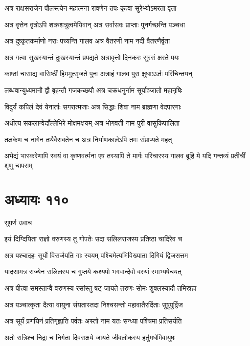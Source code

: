 \twolineshloka
{अत्र राक्षसराजेन पौलस्त्येन महात्मना}
{रावणेन तपः कृत्वा सुरेभ्योऽमरता वृता}


\twolineshloka
{अत्र वृत्तेन वृत्रोऽपि शक्रशत्रुत्वमेयिवान्}
{अत्र सर्वासवः प्राप्ताः पुनर्गच्छन्ति पञ्चधा}


\twolineshloka
{अत्र दुष्कृतकर्माणो नराः पच्यन्ति गालव}
{अत्र वैतरणी नाम नदी वैतरणैर्वृता}


\twolineshloka
{अत्र गत्वा सुखस्यान्तं दुःखस्यान्तं प्रपद्यते}
{अत्रावृत्तो दिनकरः सुरसं क्षरते पयः}


\twolineshloka
{काष्ठां चासाद्य वासिष्ठीं हिममुत्सृजते पुनः}
{अत्राहं गालव पुरा क्षुधाऽऽर्तः परिचिन्तयन्}


\twolineshloka
{लब्धवान्युध्यमानौ द्वौ बृहन्तौ गजकच्छपौ}
{अत्र चक्रधनुर्नाम सूर्याञ्जातो महानृषिः}


\twolineshloka
{विदुर्यं कपिलं देवं येनार्ताः सगरात्मजाः}
{अत्र सिद्धाः शिवा नाम ब्राह्मणा वेदपारगाः}


\twolineshloka
{अधीत्य सकलान्वेदाँल्लेभिरे मोक्षमक्षयम्}
{अत्र भोगवती नाम पुरी वासुकिपालिता}


\twolineshloka
{तक्षकेण च नागेन तथैवैरावतेन च}
{अत्र निर्याणकालेऽपि तमः संप्राप्यते महत्}


\threelineshloka
{अभेद्यं भास्करेणापि स्वयं वा कृष्णवर्त्मना}
{एष तस्यापि ते मार्गः परिचारस्य गालव}
{ब्रूहि मे यदि गन्तव्यं प्रतीचीं शृणु चापराम्}


\chapter{अध्यायः ११०}
\twolineshloka
{सुपर्ण उवाच}
{}


\twolineshloka
{इयं दिग्दियिता राज्ञो वरुणस्य तु गोपतेः}
{सदा सलिलराजस्य प्रतिष्ठा चादिरेव च}


\twolineshloka
{अत्र पश्चादहः सूर्यो विसर्जयति गाः स्वयम्}
{पश्चिमेत्यभिविख्याता दिगियं द्विजसत्तम}


\twolineshloka
{यादसामत्र राज्येन सलिलस्य च गुप्तये}
{कश्यपो भगवान्देवो वरुणं स्माभ्यषेचयत्}


\twolineshloka
{अत्र पीत्वा समस्तान्वै वरुणस्य रसांस्तु षट्}
{जायते तरुणः सोमः शुक्लस्यादौ तमिस्रहा}


\twolineshloka
{अत्र पञ्चात्कृता दैत्या वायुना संयतास्तदा}
{निश्चसन्तो महावातैरर्दिताः सुषुपुर्द्विज}


\twolineshloka
{अत्र सूर्यं प्रणयिनं प्रतिगृह्णाति पर्वतः}
{अस्तो नाम यतः सन्ध्या पश्चिमा प्रतिसर्यति}


\twolineshloka
{अतो रात्रिश्च निद्रा च निर्गता दिवसक्षये}
{जायते जीवलोकस्य हर्तुमर्धमिवायुषः}


